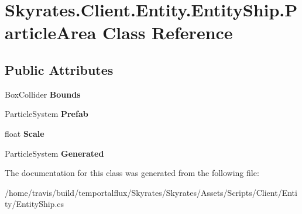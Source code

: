 \hypertarget{class_skyrates_1_1_client_1_1_entity_1_1_entity_ship_1_1_particle_area}{\section{Skyrates.\-Client.\-Entity.\-Entity\-Ship.\-Particle\-Area Class Reference}
\label{class_skyrates_1_1_client_1_1_entity_1_1_entity_ship_1_1_particle_area}
}
\subsection*{Public Attributes}
\begin{DoxyCompactItemize}
\item 
\hypertarget{class_skyrates_1_1_client_1_1_entity_1_1_entity_ship_1_1_particle_area_a2eea724ff3e887e6fcc8fa43489378ca}{Box\-Collider {\bfseries Bounds}}\label{class_skyrates_1_1_client_1_1_entity_1_1_entity_ship_1_1_particle_area_a2eea724ff3e887e6fcc8fa43489378ca}

\item 
\hypertarget{class_skyrates_1_1_client_1_1_entity_1_1_entity_ship_1_1_particle_area_a5a281c090f3bca644efac425f2b51f4e}{Particle\-System {\bfseries Prefab}}\label{class_skyrates_1_1_client_1_1_entity_1_1_entity_ship_1_1_particle_area_a5a281c090f3bca644efac425f2b51f4e}

\item 
\hypertarget{class_skyrates_1_1_client_1_1_entity_1_1_entity_ship_1_1_particle_area_a6d73a3c838965b292b81335e1721c6d7}{float {\bfseries Scale}}\label{class_skyrates_1_1_client_1_1_entity_1_1_entity_ship_1_1_particle_area_a6d73a3c838965b292b81335e1721c6d7}

\item 
\hypertarget{class_skyrates_1_1_client_1_1_entity_1_1_entity_ship_1_1_particle_area_aae459a95aca95870ffc005e75223ce0e}{Particle\-System {\bfseries Generated}}\label{class_skyrates_1_1_client_1_1_entity_1_1_entity_ship_1_1_particle_area_aae459a95aca95870ffc005e75223ce0e}

\end{DoxyCompactItemize}


The documentation for this class was generated from the following file\-:\begin{DoxyCompactItemize}
\item 
/home/travis/build/temportalflux/\-Skyrates/\-Skyrates/\-Assets/\-Scripts/\-Client/\-Entity/Entity\-Ship.\-cs\end{DoxyCompactItemize}
